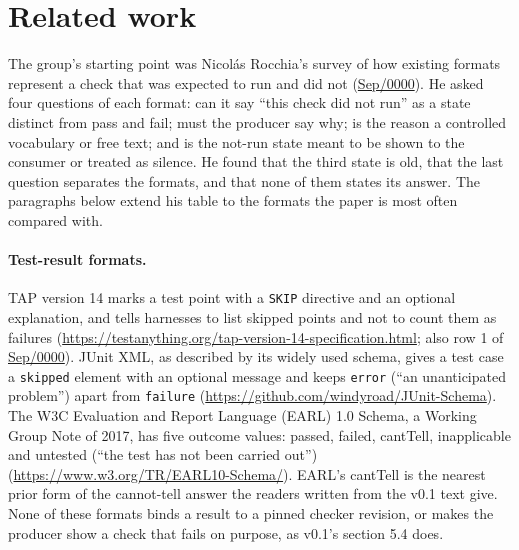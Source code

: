\providecommand{\aevmsg}[2]{\href{https://lists.w3.org/Archives/Public/public-agent-conformance/2026#1/#2.html}{#1/#2}}

\section{Related work}
\label{sec:w3c-related}

The group's starting point was Nicol\'as Rocchia's survey of how existing formats represent a check that was expected to run and did not (\aevmsg{Sep}{0000}). He asked four questions of each format: can it say ``this check did not run'' as a state distinct from pass and fail; must the producer say why; is the reason a controlled vocabulary or free text; and is the not-run state meant to be shown to the consumer or treated as silence. He found that the third state is old, that the last question separates the formats, and that none of them states its answer. The paragraphs below extend his table to the formats the paper is most often compared with.

\paragraph{Test-result formats.} TAP version 14 marks a test point with a \texttt{SKIP} directive and an optional explanation, and tells harnesses to list skipped points and not to count them as failures (\url{https://testanything.org/tap-version-14-specification.html}; also row 1 of \aevmsg{Sep}{0000}). JUnit XML, as described by its widely used schema, gives a test case a \texttt{skipped} element with an optional message and keeps \texttt{error} (``an unanticipated problem'') apart from \texttt{failure} (\url{https://github.com/windyroad/JUnit-Schema}). The W3C Evaluation and Report Language (EARL) 1.0 Schema, a Working Group Note of 2017, has five outcome values: passed, failed, cantTell, inapplicable and untested (``the test has not been carried out'') (\url{https://www.w3.org/TR/EARL10-Schema/}). EARL's cantTell is the nearest prior form of the cannot-tell answer the readers written from the v0.1 text give. None of these formats binds a result to a pinned checker revision, or makes the producer show a check that fails on purpose, as v0.1's section 5.4 does.

